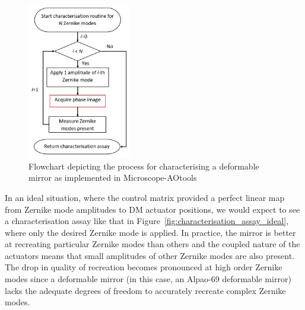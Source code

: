 \begin{figure}[h]
	\centering
	\includegraphics[width=0.4\textwidth, scale=0.5]{./images/characterisation_workflow.jpg}
	\caption{Flowchart depicting the process for characterising a deformable mirror as implemented in Microscope-AOtools}
	\label{fig:characterisation_workflow}
\end{figure}

In an ideal situation, where the control matrix provided a perfect linear map from Zernike mode amplitudes to DM actuator positions, we would expect to see a characterisation assay like that in Figure~\ref{fig:characterisation_assay_ideal}, where only the desired Zernike mode is applied. In practice, the mirror is better at recreating particular Zernike modes than others and the coupled nature of the actuators means that small amplitudes of other Zernike modes are also present. The drop in quality of recreation becomes pronounced at high order Zernike modes since a deformable mirror (in this case, an Alpao-69 deformable mirror) lacks the adequate degrees of freedom to accurately recreate complex Zernike modes.

